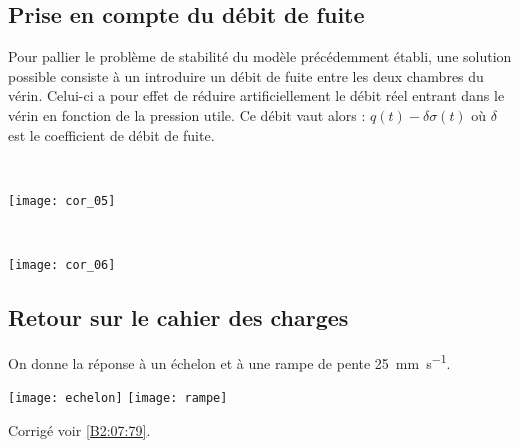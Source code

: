 \subsection*{Prise en compte du débit de fuite} 
\ifprof
\else

Pour pallier le problème de stabilité du modèle précédemment établi, une solution possible consiste à un introduire un débit de fuite entre les deux chambres du vérin. Celui-ci a pour effet de réduire artificiellement le débit réel entrant dans le vérin en fonction de la pression utile. Ce débit vaut alors : $q(t)-\delta \sigma (t)$  où $\delta$ est le coefficient de débit de fuite.
\fi

\ifprof
\newpage
\else \fi

\ifprof
\begin{corrige} ~\\
\begin{center}
\texttt{[image: cor\_05]}
\end{center}
\end{corrige}
\else
\fi


\ifprof
\begin{corrige} ~\\
\begin{center}
\texttt{[image: cor\_06]}
\end{center}
\end{corrige}
\else
\fi
\subsection*{Retour sur le cahier des charges}
On donne la réponse à un échelon et à une rampe de pente \SI{25}{mm.s^{-1}}.



\begin{center}
\texttt{[image: echelon]}
\texttt{[image: rampe]}
\end{center}




\ifprof
\else
\begin{flushright}
\footnotesize{Corrigé  voir \ref{B2:07:79}.}
\end{flushright}%
\fi